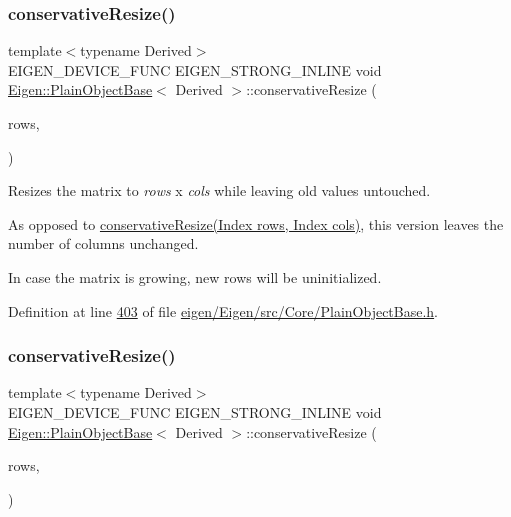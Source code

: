 \subsubsection{\texorpdfstring{conservative\+Resize()}{conservativeResize()}\hspace{0.1cm}{\footnotesize\ttfamily [3/8]}}
{\footnotesize\ttfamily template$<$typename Derived$>$ \\
E\+I\+G\+E\+N\+\_\+\+D\+E\+V\+I\+C\+E\+\_\+\+F\+U\+NC E\+I\+G\+E\+N\+\_\+\+S\+T\+R\+O\+N\+G\+\_\+\+I\+N\+L\+I\+NE void \hyperlink{class_eigen_1_1_plain_object_base}{Eigen\+::\+Plain\+Object\+Base}$<$ Derived $>$\+::conservative\+Resize (\begin{DoxyParamCaption}\item[{\hyperlink{namespace_eigen_a62e77e0933482dafde8fe197d9a2cfde}{Index}}]{rows,  }\item[{No\+Change\+\_\+t}]{ }\end{DoxyParamCaption})\hspace{0.3cm}{\ttfamily [inline]}}

Resizes the matrix to {\itshape rows} x {\itshape cols} while leaving old values untouched.

As opposed to \hyperlink{class_eigen_1_1_plain_object_base_a5e06c62950ba98fe8ba9c7d4be9c19e4}{conservative\+Resize(\+Index rows, Index cols)}, this version leaves the number of columns unchanged.

In case the matrix is growing, new rows will be uninitialized. 

Definition at line \hyperlink{eigen_2_eigen_2src_2_core_2_plain_object_base_8h_source_l00403}{403} of file \hyperlink{eigen_2_eigen_2src_2_core_2_plain_object_base_8h_source}{eigen/\+Eigen/src/\+Core/\+Plain\+Object\+Base.\+h}.

\mbox{\label{class_eigen_1_1_plain_object_base_a528879aef40f9cbc4ab4925e4a6bceb9}} 
\subsubsection{\texorpdfstring{conservative\+Resize()}{conservativeResize()}\hspace{0.1cm}{\footnotesize\ttfamily [4/8]}}
{\footnotesize\ttfamily template$<$typename Derived$>$ \\
E\+I\+G\+E\+N\+\_\+\+D\+E\+V\+I\+C\+E\+\_\+\+F\+U\+NC E\+I\+G\+E\+N\+\_\+\+S\+T\+R\+O\+N\+G\+\_\+\+I\+N\+L\+I\+NE void \hyperlink{class_eigen_1_1_plain_object_base}{Eigen\+::\+Plain\+Object\+Base}$<$ Derived $>$\+::conservative\+Resize (\begin{DoxyParamCaption}\item[{\hyperlink{namespace_eigen_a62e77e0933482dafde8fe197d9a2cfde}{Index}}]{rows,  }\item[{No\+Change\+\_\+t}]{ }\end{DoxyParamCaption})\hspace{0.3cm}{\ttfamily [inline]}}

